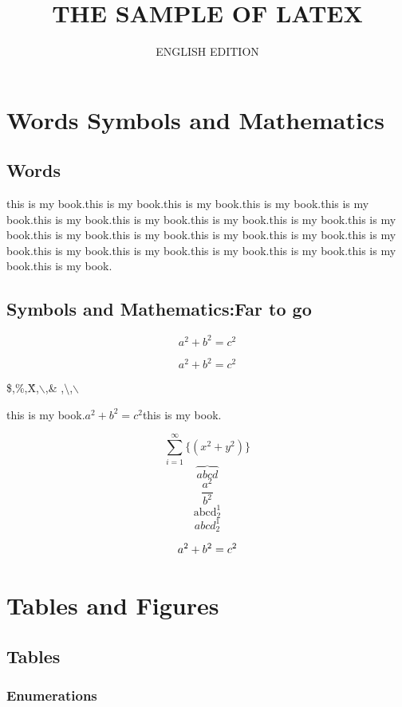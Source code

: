 \documentclass{book}
\begin{document}
\title{THE SAMPLE OF LATEX}
\author{ENGLISH EDITION}
\date{}
\maketitle

\tableofcontents

\mainmatter

\part{Words  Symbols and Mathematics}

\chapter{Words}

this is my book.this is my book.this is my book.this is my book.this is my book.this is my book.this is my book.this is my book.this is my book.this is my book.this is my book.this is my book.this is my book.this is my book.this is my book.this is my book.this is my book.this is my book.this is my book.this is my book.this is my book.


\chapter{Symbols and Mathematics:Far to go}

\[a^2+b^2=c^2\]

$$a^2+b^2=c^2$$

\$,\%,\^X,$\backslash$,\& ,$\setminus$,$\backslash$

this is my book.$a^2+b^2=c^2$this is my book.

$$\sum^\infty_{i=1} \lbrace (x^2+y^2) \rbrace $$
$$\overbrace{abcd}$$
$$\frac{a^2}{b^2}$$
$$\mathop{abcd}^1_2$$
$${abcd}^1_2$$

\begin{equation}
a^2+b^2=c^2\\
\end{equation}


\part{Tables and Figures}

\chapter{Tables}

\section{Enumerations}
\end{document}
